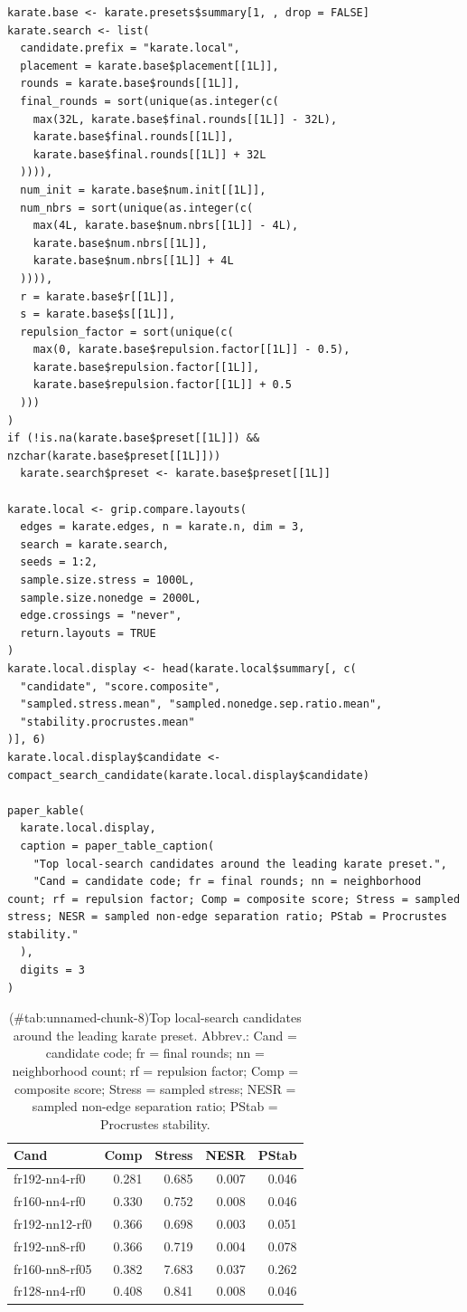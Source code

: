 \begin{verbatim}
karate.base <- karate.presets$summary[1, , drop = FALSE]
karate.search <- list(
  candidate.prefix = "karate.local",
  placement = karate.base$placement[[1L]],
  rounds = karate.base$rounds[[1L]],
  final_rounds = sort(unique(as.integer(c(
    max(32L, karate.base$final.rounds[[1L]] - 32L),
    karate.base$final.rounds[[1L]],
    karate.base$final.rounds[[1L]] + 32L
  )))),
  num_init = karate.base$num.init[[1L]],
  num_nbrs = sort(unique(as.integer(c(
    max(4L, karate.base$num.nbrs[[1L]] - 4L),
    karate.base$num.nbrs[[1L]],
    karate.base$num.nbrs[[1L]] + 4L
  )))),
  r = karate.base$r[[1L]],
  s = karate.base$s[[1L]],
  repulsion_factor = sort(unique(c(
    max(0, karate.base$repulsion.factor[[1L]] - 0.5),
    karate.base$repulsion.factor[[1L]],
    karate.base$repulsion.factor[[1L]] + 0.5
  )))
)
if (!is.na(karate.base$preset[[1L]]) && nzchar(karate.base$preset[[1L]]))
  karate.search$preset <- karate.base$preset[[1L]]

karate.local <- grip.compare.layouts(
  edges = karate.edges, n = karate.n, dim = 3,
  search = karate.search,
  seeds = 1:2,
  sample.size.stress = 1000L,
  sample.size.nonedge = 2000L,
  edge.crossings = "never",
  return.layouts = TRUE
)
karate.local.display <- head(karate.local$summary[, c(
  "candidate", "score.composite",
  "sampled.stress.mean", "sampled.nonedge.sep.ratio.mean",
  "stability.procrustes.mean"
)], 6)
karate.local.display$candidate <- compact_search_candidate(karate.local.display$candidate)

paper_kable(
  karate.local.display,
  caption = paper_table_caption(
    "Top local-search candidates around the leading karate preset.",
    "Cand = candidate code; fr = final rounds; nn = neighborhood count; rf = repulsion factor; Comp = composite score; Stress = sampled stress; NESR = sampled non-edge separation ratio; PStab = Procrustes stability."
  ),
  digits = 3
)
\end{verbatim}

\begin{table}

\caption{(\#tab:unnamed-chunk-8)Top local-search candidates around the leading karate preset. Abbrev.: Cand = candidate code; fr = final rounds; nn = neighborhood count; rf = repulsion factor; Comp = composite score; Stress = sampled stress; NESR = sampled non-edge separation ratio; PStab = Procrustes stability.}
\centering
\begin{tabular}[t]{l|r|r|r|r}
\hline
Cand & Comp & Stress & NESR & PStab\\
\hline
fr192-nn4-rf0 & 0.281 & 0.685 & 0.007 & 0.046\\
\hline
fr160-nn4-rf0 & 0.330 & 0.752 & 0.008 & 0.046\\
\hline
fr192-nn12-rf0 & 0.366 & 0.698 & 0.003 & 0.051\\
\hline
fr192-nn8-rf0 & 0.366 & 0.719 & 0.004 & 0.078\\
\hline
fr160-nn8-rf05 & 0.382 & 7.683 & 0.037 & 0.262\\
\hline
fr128-nn4-rf0 & 0.408 & 0.841 & 0.008 & 0.046\\
\hline
\end{tabular}
\end{table}

